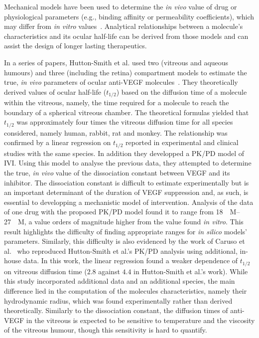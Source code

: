 \documentclass{article}
\begin{document}
Mechanical models have been used to determine the \textit{in vivo} value of drug or physiological parameters (e.g., binding affinity or permeability coefficients), which may differ from \textit{in vitro} values~\cite{Bussing_2020,Caruso_2020,HuttonSmith_2016,HuttonSmith_2017,HuttonSmith_2018}.
Analytical relationships between a molecule's characteristics and its ocular half-life can be derived from those models and can assist the design of longer lasting therapeutics.

In a series of papers, Hutton-Smith et al. used two (vitreous and aqueous humours) and three (including the retina) compartment models to estimate the true, \textit{in vivo} parameters of ocular anti-VEGF molecules~\cite{HuttonSmith_2016,HuttonSmith_2017,HuttonSmith_2018}.
They theoretically derived values of ocular half-life ($t_{1/2}$) based on the diffusion time of a molecule within the vitreous, namely, the time required for a molecule to reach the boundary of a spherical vitreous chamber.
The theoretical formulas yielded that $t_{1/2}$ was approximately four times the vitreous diffusion time for all species considered, namely human, rabbit, rat and monkey.
The relationship was confirmed by a linear regression on $t_{1/2}$ reported in experimental and clinical studies with the same species.
In addition they developped a PK/PD model of IVI.
Using this model to analyse the previous data, they attempted to determine the true, \textit{in vivo} value of the dissociation constant between VEGF and its inhibitor.
The dissociation constant is difficult to estimate experimentally but is an important determinant of the duration of VEGF suppression\cite{HuttonSmith_2016} and, as such, is essential to developping a mechanistic model of intervention.
Analysis of the data of one drug with the proposed PK/PD model found it to range from \SIrange[range-phrase={ {to} }]{18}{27}{\nano\textsc{M}}, a value orders of magnitude higher from the value found \textit{in vitro}.
This result highlights the difficulty of finding appropriate ranges for \textit{in silico} models' parameters.
Similarly, this difficulty is also evidenced by the work of Caruso et al.~\cite{Caruso_2020} who reproduced Hutton-Smith et al.'s PK/PD analysis using additional, in-house data.
In this work, the linear regression found a weaker dependence of $t_{1/2}$ on vitreous diffusion time ($2.8$ against $4.4$ in Hutton-Smith et al.'s work).
While this study incorporated additional data and an additional species, the main difference lied in the computation of the molecules characteristics, namely their hydrodynamic radius, which was found experimentally rather than derived theoretically.
Similarly to the dissociation constant, the diffusion times of anti-VEGF in the vitreous is expected to be sensitive to temperature and the viscosity of the vitreous humour, though this sensitivity is hard to quantify.
\end{document}
